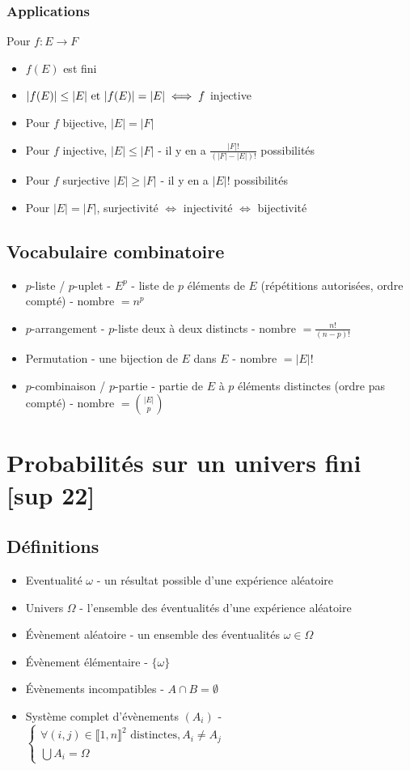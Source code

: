 \documentclass[openany]{book}
\begin{document}
\subsubsection{Applications}
Pour $f:E \rightarrow F$
\begin{itemize}
    \item $f(E)$ est fini
    \item $|f(E)| \leq |E| \text{ et } |f(E)| = |E| \iff f$ injective
    \item Pour $f$ bijective, $|E| = |F|$
    \item Pour $f$ injective, $|E| \leq |F|$ - il y en a $\frac{|F|!}{(|F|-|E|)!}$ possibilités 
    \item Pour $f$ surjective $|E| \geq |F|$ - il y en a $|E|!$ possibilités
    \item Pour $|E|=|F|$, surjectivité $\iff$ injectivité $\iff$ bijectivité
\end{itemize}

\subsection{Vocabulaire combinatoire}
\begin{itemize}
    \item $p$-liste / $p$-uplet - $E^p$ - liste de $p$ éléments de $E$ (répétitions autorisées, ordre compté) - nombre $= n^p$
    \item $p$-arrangement - $p$-liste deux à deux distincts - nombre $=\frac{n!}{(n-p)!}$
    \item Permutation - une bijection de $E$ dans $E$ - nombre $=|E|!$
    \item $p$-combinaison / $p$-partie - partie de $E$ à $p$ éléments distinctes (ordre pas compté) - nombre $=\binom{|E|}{p}$ 
\end{itemize}

\clearpage
\section{Probabilités sur un univers fini [sup 22]}
\subsection{Définitions}
\begin{itemize}
    \item Eventualité $\omega$ - un résultat possible d'une expérience aléatoire
    \item Univers $\Omega$ - l'ensemble des éventualités d'une expérience aléatoire
    \item Évènement aléatoire - un ensemble des éventualités $\omega \in \Omega$
    \item Évènement élémentaire - $\{\omega\}$
    \item Évènements incompatibles - $ A \cap B = \emptyset $
    \item Système complet d'évènements $(A_i)$ - $\begin{cases}
        \forall (i, j) \in \llbracket 1, n \rrbracket^2 \text{ distinctes}, A_i \neq A_j \\
        \bigcup A_i = \Omega
    \end{cases}$
\end{itemize}
\end{document}
